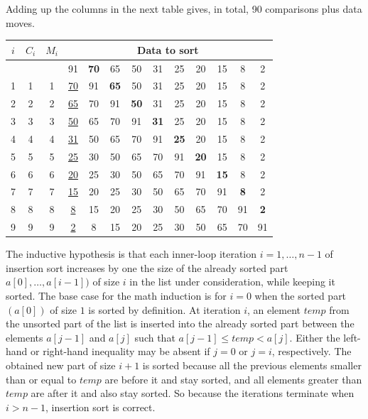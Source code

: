 {}%
Adding up the columns in the next table gives, in total, 90 comparisons 
plus data moves. 
\begin{center}
\begin{tabular}{|c|c|c|c|c|c|c|c|c|c|c|c|c|}
\hline
\(i\)& \(C_i\)& \(M_i\) &\multicolumn{10}{|c|}{\textbf{Data to sort}} \\
\hline
\multicolumn{3}{|c|}{}& 91& \textbf{70}& 65& 50& 31& 25& 20& 15& 8& 2 \\
\hline
1& 1& 1& \underline{70} & 91& \textbf{65}& 50& 31& 25& 20& 15& 8& 2 \\
\hline
2& 2& 2& \underline{65} & 70& 91& \textbf{50}& 31& 25& 20& 15& 8& 2 \\
\hline
3& 3& 3& \underline{50} & 65& 70& 91& \textbf{31}& 25& 20& 15& 8& 2 \\
\hline
4& 4& 4& \underline{31} & 50& 65& 70& 91& \textbf{25}& 20& 15& 8& 2 \\
\hline
5& 5& 5& \underline{25} & 30& 50& 65& 70& 91& \textbf{20}& 15& 8& 2 \\
\hline
6& 6& 6& \underline{20} & 25& 30& 50& 65& 70& 91& \textbf{15}& 8& 2 \\
\hline
7& 7& 7& \underline{15} & 20& 25& 30& 50& 65& 70& 91& \textbf{8}& 2 \\
\hline
8& 8& 8& \underline{8} & 15& 20& 25& 30& 50& 65& 70& 91& \textbf{2} \\
\hline
9& 9& 9& \underline{2} & 8& 15& 20& 25& 30& 50& 65& 70& 91 \\
\hline
\end{tabular}
\end{center}

The inductive hypothesis is that each inner-loop iteration $i = 1,\ldots,n-1$ of insertion sort increases by one
the size of the already sorted part $a[0],\ldots, a[i-1])$ of size $i$
in the list under consideration, while keeping it sorted.
The base case for the math induction is for $i=0$ when the sorted part $(a[0])$ of size $1$ is sorted by definition. 
At iteration $i$, an element  $temp$ from the
unsorted part of the list is inserted into the already sorted part
between the elements $a[j-1]$ and $a[j]$ such that $a[j-1]\leq temp < a[j]$. 
Either the left-hand  or right-hand inequality may be absent if $j=0$ or $j=i$, respectively. 
The obtained new part of size $i+1$ is sorted because
all the previous elements smaller than or equal to \(temp\) are before it
and stay sorted, 
and all elements greater than \(temp\) are after it and also stay sorted. 
So because the iterations terminate when $i > n-1$, 
insertion sort is correct.

